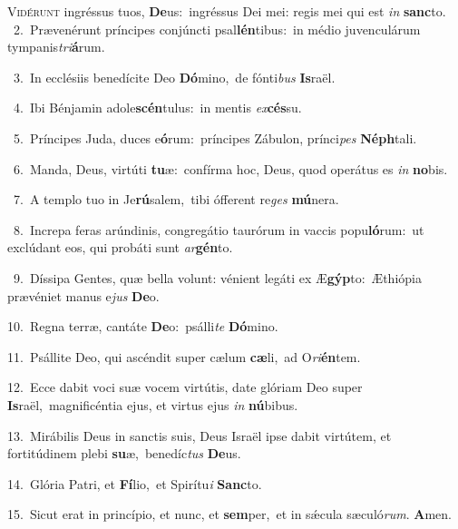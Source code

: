 \lettrine{\initial\textcolor{\initialcolor}{V}}{idérunt} ingréssus tuos, \textbf{De}\-us:~\star ingréssus Dei mei: regis mei qui est \textit{in} \textbf{sanc}\-to.\\
{\numbfont\textcolor{\numbcolor}{~2.}}~Prævenérunt príncipes conjúncti psal\-\textbf{lén}\-tibus:~\star in médio juvenculárum tympanis\-\textit{tri}\-\textbf{á}rum.\par
{\numbfont\textcolor{\numbcolor}{~3.}}~In ecclésiis benedícite Deo \textbf{Dó}\-mino,~\star de fónti\textit{bus} \textbf{Is}\-raël.\par
{\numbfont\textcolor{\numbcolor}{~4.}}~Ibi Bénjamin adole\-\textbf{scén}\-tulus:~\star in mentis \textit{ex}\-\textbf{cés}su.\par
{\numbfont\textcolor{\numbcolor}{~5.}}~Príncipes Juda, duces e\-\textbf{ó}\-rum:~\star príncipes Zábulon, prínci\textit{pes} \textbf{Néph}\-tali.\par
{\numbfont\textcolor{\numbcolor}{~6.}}~Manda, Deus, virtúti \textbf{tu}\-æ:~\star confírma hoc, Deus, quod operátus es \textit{in} \textbf{no}\-bis.\par
{\numbfont\textcolor{\numbcolor}{~7.}}~A templo tuo in Je\-\textbf{rú}\-salem,~\star tibi ófferent re\textit{ges} \textbf{mú}\-nera.\par
{\numbfont\textcolor{\numbcolor}{~8.}}~Increpa feras arúndinis, congregátio taurórum in vaccis popu\-\textbf{ló}\-rum:~\star ut exclúdant eos, qui probáti sunt \textit{ar}\-\textbf{gén}to.\par
{\numbfont\textcolor{\numbcolor}{~9.}}~Díssipa Gentes, quæ bella volunt: vénient legáti ex Æ\-\textbf{gýp}\-to:~\star Æthiópia prævéniet manus e\textit{jus} \textbf{De}\-o.\par
{\numbfont\textcolor{\numbcolor}{10.}}~Regna terræ, cantáte \textbf{De}\-o:~\star psálli\textit{te} \textbf{Dó}\-mino.\par
{\numbfont\textcolor{\numbcolor}{11.}}~Psállite Deo, qui ascéndit super cælum \textbf{cæ}\-li,~\star ad O\-\textit{ri}\-\textbf{én}tem.\par
{\numbfont\textcolor{\numbcolor}{12.}}~Ecce dabit voci suæ vocem virtútis, date glóriam Deo super \textbf{Is}\-raël,~\star magnificéntia ejus, et virtus ejus \textit{in} \textbf{nú}\-bibus.\par
{\numbfont\textcolor{\numbcolor}{13.}}~Mirábilis Deus in sanctis suis, Deus Israël ipse dabit virtútem, et fortitúdinem plebi \textbf{su}\-æ,~\star benedíc\textit{tus} \textbf{De}\-us.\par
{\numbfont\textcolor{\numbcolor}{14.}}~Glória Patri, et \textbf{Fí}\-lio,~\star et Spirítu\textit{i} \textbf{Sanc}\-to.\par
{\numbfont\textcolor{\numbcolor}{15.}}~Sicut erat in princípio, et nunc, et \textbf{sem}\-per,~\star et in sǽcula sæculó\-\textit{rum}\-. \textbf{A}\-men.\par
